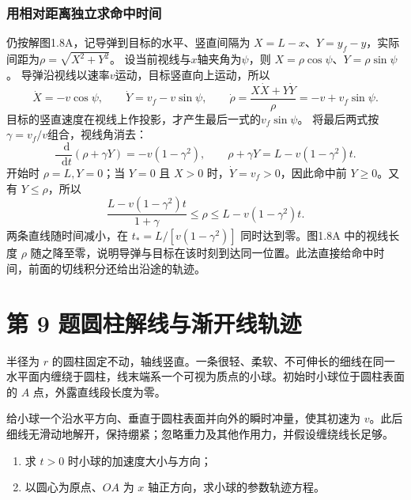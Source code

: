 \documentclass[UTF8,fontset=fandol,a4paper,11pt]{ctexart}
\newcommand{\dd}{\mathop{}\!\mathrm{d}}
\newcommand{\tagline}[1]{\noindent{\small\color{muted}#1}\par}
\begin{document}
\subsubsection*{用相对距离独立求命中时间}
仍按解图1.8A，记导弹到目标的水平、竖直间隔为
$X=L-x$、$Y=y_f-y$，实际间距为$\rho=\sqrt{X^2+Y^2}$。
设当前视线与$x$轴夹角为$\psi$，则
$X=\rho\cos\psi$、$Y=\rho\sin\psi$。
导弹沿视线以速率$v$运动，目标竖直向上运动，所以
\[
\dot X=-v\cos\psi,\qquad
\dot Y=v_f-v\sin\psi,\qquad
\dot\rho=\frac{X\dot X+Y\dot Y}{\rho}
=-v+v_f\sin\psi.
\]
目标的竖直速度在视线上作投影，才产生最后一式的$v_f\sin\psi$。
将最后两式按$\gamma=v_f/v$组合，视线角消去：
\[
\frac{\dd}{\dd t}(\rho+\gamma Y)
=-v(1-\gamma^2),\qquad
\rho+\gamma Y=L-v(1-\gamma^2)t.
\]
开始时 $\rho=L,Y=0$；当 $Y=0$ 且 $X>0$ 时，$\dot Y=v_f>0$，因此命中前 $Y\geq0$。又有 $Y\leq\rho$，所以
\[
\frac{L-v(1-\gamma^2)t}{1+\gamma}\leq\rho\leq L-v(1-\gamma^2)t.
\]
两条直线随时间减小，在 $t_*=L/[v(1-\gamma^2)]$ 同时达到零。图1.8A 中的视线长度 $\rho$ 随之降至零，说明导弹与目标在该时刻到达同一位置。此法直接给命中时间，前面的切线积分还给出沿途的轨迹。




\section*{第 9 题\quad 圆柱解线与渐开线轨迹}

\tagline{M-01-09}

半径为 $r$ 的圆柱固定不动，轴线竖直。一条很轻、柔软、不可伸长的细线在同一水平面内缠绕于圆柱，线末端系一个可视为质点的小球。初始时小球位于圆柱表面的 $A$ 点，外露直线段长度为零。

给小球一个沿水平方向、垂直于圆柱表面并向外的瞬时冲量，使其初速为 $v$。此后细线无滑动地解开，保持绷紧；忽略重力及其他作用力，并假设缠绕线长足够。
\begin{enumerate}
\item 求 $t>0$ 时小球的加速度大小与方向；
\item 以圆心为原点、$OA$ 为 $x$ 轴正方向，求小球的参数轨迹方程。
\end{enumerate}
\end{document}
